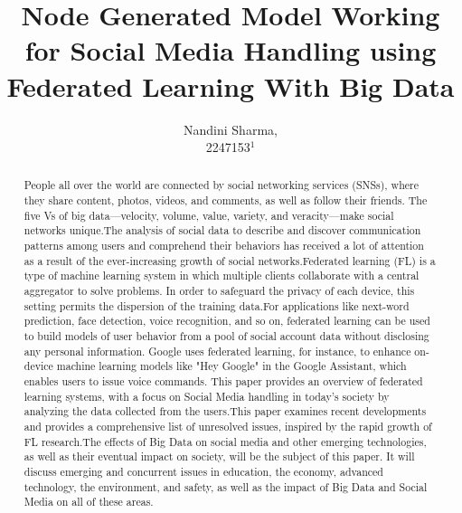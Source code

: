 \documentclass[openacc]{rsproca_new}%
\begin{document}
\title{Node Generated Model Working for Social Media Handling using Federated Learning With Big Data}

\author{%
Nandini Sharma,\\2247153$^{1}$}

\address{$^{1}51,CL Layout,Hosur Main Road,Bengaluru$}


\subject{Big Data, Federated Learning, Social Media & Approach}



\begin{abstract}
People all over the world are connected by social networking services (SNSs), where they share content, photos, videos, and comments, as well as follow their friends. The five Vs of big data—velocity, volume, value, variety, and veracity—make social networks unique.The analysis of social data to describe and discover communication patterns among users and comprehend their behaviors has received a lot of attention as a result of the ever-increasing growth of social networks.Federated learning (FL) is a type of machine learning system in which multiple clients collaborate with a central aggregator to solve problems. In order to safeguard the privacy of each device, this setting permits the dispersion of the training data.For applications like next-word prediction, face detection, voice recognition, and so on, federated learning can be used to build models of user behavior from a pool of social account data without disclosing any personal information. Google uses federated learning, for instance, to enhance on-device machine learning models like "Hey Google" in the Google Assistant, which enables users to issue voice commands.
This paper provides an overview of federated learning systems, with a focus on Social Media handling in today's society by analyzing the data collected from the users.This paper examines recent developments and provides a comprehensive list of unresolved issues, inspired by the rapid growth of FL research.The effects of Big Data on social media and other emerging technologies, as well as their eventual impact on society, will be the subject of this paper. It will discuss emerging and concurrent issues in education, the economy, advanced technology, the environment, and safety, as well as the impact of Big Data and Social Media on all of these areas.
\end{abstract}
\end{document}
